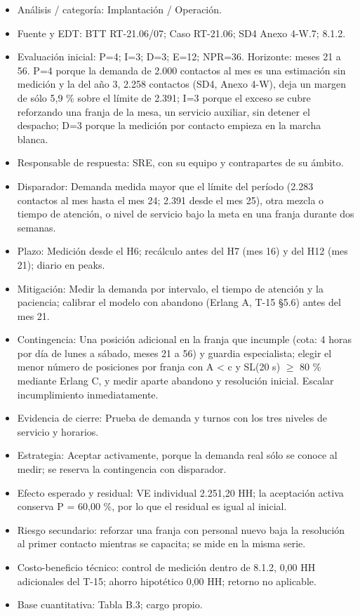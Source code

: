 \begin{itemize}[leftmargin=*,itemsep=3pt]
\item Análisis / categoría: Implantación / Operación.
\item Fuente y EDT: BTT RT-21.06/07; Caso RT-21.06; SD4 Anexo 4-W.7; 8.1.2.
\item Evaluación inicial: P=4; I=3; D=3; E=12; NPR=36. Horizonte: meses 21 a 56. P=4 porque la demanda de 2.000 contactos al mes es una estimación sin medición y la del año 3, 2.258 contactos (SD4, Anexo 4-W), deja un margen de sólo 5,9 \% sobre el límite de 2.391; I=3 porque el exceso se cubre reforzando una franja de la mesa, un servicio auxiliar, sin detener el despacho; D=3 porque la medición por contacto empieza en la marcha blanca.
\item Responsable de respuesta: SRE, con su equipo y contrapartes de su ámbito.
\item Disparador: Demanda medida mayor que el límite del período (2.283 contactos al mes hasta el mes 24; 2.391 desde el mes 25), otra mezcla o tiempo de atención, o nivel de servicio bajo la meta en una franja durante dos semanas.
\item Plazo: Medición desde el H6; recálculo antes del H7 (mes 16) y del H12 (mes 21); diario en peaks.
\item Mitigación: Medir la demanda por intervalo, el tiempo de atención y la paciencia; calibrar el modelo con abandono (Erlang A, T-15 §5.6) antes del mes 21.
\item Contingencia: Una posición adicional en la franja que incumple (cota: 4 horas por día de lunes a sábado, meses 21 a 56) y guardia especialista; elegir el menor número de posiciones por franja con A < c y SL(20 s) \ensuremath{\geq} 80 \% mediante Erlang C, y medir aparte abandono y resolución inicial. Escalar incumplimiento inmediatamente.
\item Evidencia de cierre: Prueba de demanda y turnos con los tres niveles de servicio y horarios.
\item Estrategia: Aceptar activamente, porque la demanda real sólo se conoce al medir; se reserva la contingencia con disparador.
\item Efecto esperado y residual: VE individual 2.251,20 HH; la aceptación activa conserva P = 60,00 \%, por lo que el residual es igual al inicial.
\item Riesgo secundario: reforzar una franja con personal nuevo baja la resolución al primer contacto mientras se capacita; se mide en la misma serie.
\item Costo-beneficio técnico: control de medición dentro de 8.1.2, 0,00 HH adicionales del T-15; ahorro hipotético 0,00 HH; retorno no aplicable.
\item Base cuantitativa: Tabla B.3; cargo propio.
\end{itemize}

